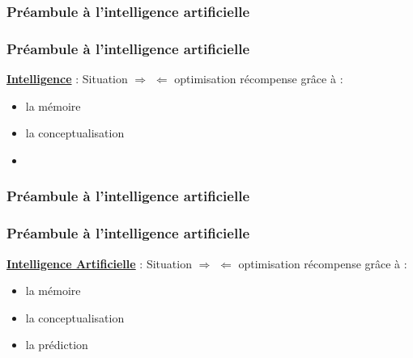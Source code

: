 \documentclass{formation}
\begin{document}
\begin{frame}
  \frametitle{Préambule à l'intelligence artificielle}
\end{frame}

\begin{frame}
  \frametitle{Préambule à l'intelligence artificielle}
  \underline{\textbf{Intelligence}} :
  \newline
  \newline
  Situation $\Rightarrow$  $\Leftarrow$ optimisation récompense
  \newline
  grâce à :
  \begin{itemize}
  \item la mémoire
  \item la conceptualisation
  \item {}
  \end{itemize}
\end{frame}

\begin{frame}
  \frametitle{Préambule à l'intelligence artificielle}
  \begin{center}
    \huge{}
  \end{center}
\end{frame}

\begin{frame}
  \frametitle{Préambule à l'intelligence artificielle}
  \underline{\textbf{Intelligence Artificielle}} :
  \newline
  \newline
  Situation $\Rightarrow$  $\Leftarrow$ optimisation récompense
  \newline
  grâce à :
  \begin{itemize}
  \item la mémoire
  \item la conceptualisation
  \item la prédiction
  \end{itemize}
\end{frame}
\end{document}
